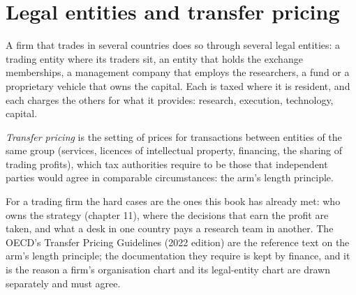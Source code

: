 \section{Legal entities and transfer pricing}

A firm that trades in several countries does so through several legal entities: a trading entity where its traders sit, an entity that holds the
exchange memberships, a management company that employs the researchers, a fund or a proprietary vehicle that owns the capital. Each is taxed
where it is resident, and each charges the others for what it provides: research, execution, technology, capital.

\begin{definition}\label{def:fm:finance-product-control-and-tax:tp}
\emph{Transfer pricing} is the setting of prices for transactions between entities of the same group (services,
licences of intellectual property, financing, the sharing of trading profits), which tax authorities require to be those that independent parties
would agree in comparable circumstances: the arm's length principle.
\end{definition}

For a trading firm the hard cases are the ones this book has already met: who owns the strategy (chapter 11), where the decisions that earn the
profit are taken, and what a desk in one country pays a research team in another. The OECD's Transfer Pricing Guidelines (2022 edition) are the
reference text on the arm's length principle; the documentation they require is kept by finance, and it is the reason a firm's organisation chart and its
legal-entity chart are drawn separately and must agree.

\begin{omfigure}

\label{fig:fm:finance-product-control-and-tax:entities}
\end{omfigure}


